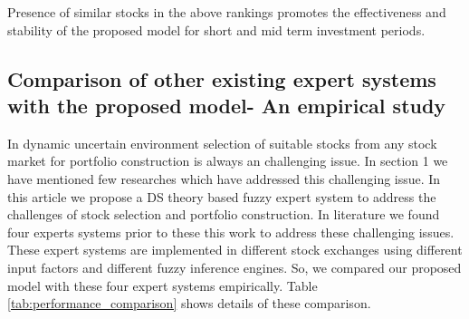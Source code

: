 \documentclass{ws-ijufks}
\begin{document}
Presence of similar stocks in the above rankings promotes the effectiveness and stability of the proposed model for 
short and mid term investment periods. 

\subsection{Comparison of other existing expert systems with the proposed model- An empirical 
study}
In dynamic uncertain environment selection of suitable stocks from any stock market for portfolio construction is 
always an challenging issue. In section 1 we have mentioned few researches which have addressed this challenging issue. 
In this article we propose a DS theory based fuzzy expert system to address the challenges of stock selection and 
portfolio construction. In literature we found four experts systems prior to these this work to address these 
challenging issues. These expert systems are implemented in different stock exchanges using different input factors and 
different fuzzy inference engines. So, we compared our proposed model with these four expert systems empirically. Table 
\ref{tab:performance_comparison} shows details of these comparison. 
\end{document}
